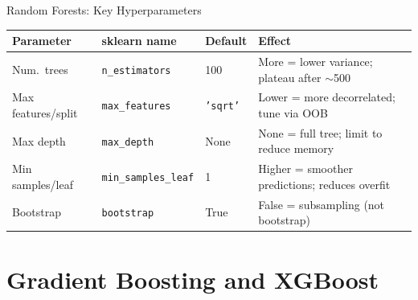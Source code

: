 \documentclass[aspectratio=169, 10pt]{beamer}
\begin{document}
\begin{frame}{Random Forests: Key Hyperparameters}
  \begin{center}
  \footnotesize
  \begin{tabular}{p{2.8cm}p{2.5cm}p{2.2cm}p{3.8cm}}
    \toprule
    \textbf{Parameter} & \textbf{sklearn name} & \textbf{Default} & \textbf{Effect} \\
    \midrule
    Num.\ trees
      & \texttt{n\_estimators}
      & 100
      & More = lower variance; plateau after $\sim$500 \\
    Max features/split
      & \texttt{max\_features}
      & \texttt{'sqrt'}
      & Lower = more decorrelated; tune via OOB \\
    Max depth
      & \texttt{max\_depth}
      & None
      & None = full tree; limit to reduce memory \\
    Min samples/leaf
      & \texttt{min\_samples\_leaf}
      & 1
      & Higher = smoother predictions; reduces overfit \\
    Bootstrap
      & \texttt{bootstrap}
      & True
      & False = subsampling (not bootstrap) \\
    \bottomrule
  \end{tabular}
  \end{center}

  \medskip
\end{frame}

\section{Gradient Boosting and XGBoost}

\end{document}
